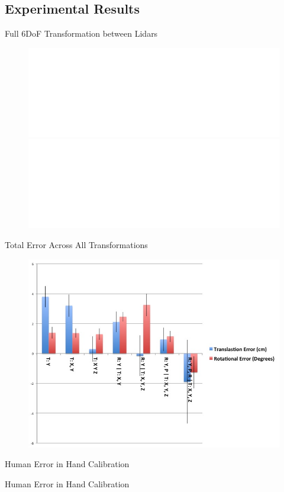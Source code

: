 \documentclass{beamer}
\begin{document}
\subsection{Experimental Results}
\begin{frame}{Full 6DoF Transformation between Lidars}
    \begin{figure}
    \vskip-80pt
        \includegraphics<1>[width=1\textwidth]{Images/6dof_rot.pdf}
        \includegraphics<2>[width=1\textwidth]{Images/6dof_trans.pdf}
    \end{figure}
\end{frame}


\begin{frame}{Total Error Across All Transformations}
    \begin{figure}
        \centering
        \includegraphics[width=.9\textwidth]{Images/total_error.jpg}
    \end{figure}
\end{frame}

\begin{frame}{Human Error in Hand Calibration}
    \begin{figure}
        \centering
        
    \end{figure}
\end{frame}

\begin{frame}{Human Error in Hand Calibration}
    \begin{figure}
        \centering
        
    \end{figure}
\end{frame}
\end{document}
